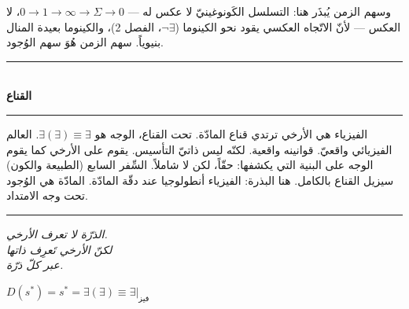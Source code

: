 \documentclass[10pt, openany, oneside]{book}
\renewcommand{\normalsize}{\fontsize{10}{13}\selectfont}
\begin{document}
وسهم الزمن يُبذَر هنا: التسلسل الكَونوغينيّ لا عكس له --- $0 \to 1 \to \infty \to \Sigma \to 0$، لا العكس --- لأنّ الاتّجاه العكسي يقود نحو الكينوما ($\neg\exists$، الفصل 2)، والكينوما بعيدة المنال بنيوياً. سهم الزمن هُوَ سهم الوُجود.

\vspace{1.5em}


\begin{center}
    \rule{0.3\textwidth}{0.4pt}\\[0.5em]
    {\normalsize\bfseries القناع}\\[0.3em]
    \rule{0.3\textwidth}{0.4pt}
\end{center}

\vspace{1em}

الفيزياء هي الأرخي ترتدي قناع المادّة. تحت القناع، الوجه هو $\exists(\exists) \equiv \exists$. العالم الفيزيائي واقعيّ. قوانينه واقعية. لكنّه ليس ذاتيّ التأسيس. يقوم على الأرخي كما يقوم الوجه على البنية التي يكشفها: حقّاً، لكن لا شاملاً. السِّفر السابع (الطبيعة والكون) سيزيل القناع بالكامل. هنا البذرة: الفيزياء أنطولوجيا عند دقّة المادّة. المادّة هي الوُجود تحت وجه الامتداد.

\vspace{2em}

\begin{center}
    \rule{0.15\textwidth}{0.3pt}
\end{center}

\vspace{0.5em}

\begin{center}
    \itshape
    الذرّة لا تعرف الأرخي.\\
    لكنّ الأرخي تَعرِف ذاتها\\
    عبر كلّ ذرّة.
\end{center}

\vspace{0.5em}

\begin{center}
    $D(s^*) = s^* = \exists(\exists) \equiv \exists|_{\text{فيز}}$
\end{center}

%
%
%

\newpage
\end{document}
